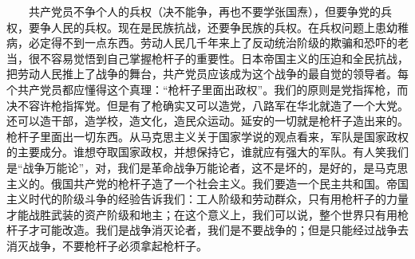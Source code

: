 \documentclass[cn,11pt,chinese]{elegantbook}
\begin{document}
　　共产党员不争个人的兵权（决不能争，再也不要学张国焘），但要争党的兵权，要争人民的兵权。现在是民族抗战，还要争民族的兵权。在兵权问题上患幼稚病，必定得不到一点东西。劳动人民几千年来上了反动统治阶级的欺骗和恐吓的老当，很不容易觉悟到自己掌握枪杆子的重要性。日本帝国主义的压迫和全民抗战，把劳动人民推上了战争的舞台，共产党员应该成为这个战争的最自觉的领导者。每个共产党员都应懂得这个真理：“枪杆子里面出政权”。我们的原则是党指挥枪，而决不容许枪指挥党。但是有了枪确实又可以造党，八路军在华北就造了一个大党。还可以造干部，造学校，造文化，造民众运动。延安的一切就是枪杆子造出来的。枪杆子里面出一切东西。从马克思主义关于国家学说的观点看来，军队是国家政权的主要成分。谁想夺取国家政权，并想保持它，谁就应有强大的军队。有人笑我们是“战争万能论”，对，我们是革命战争万能论者，这不是坏的，是好的，是马克思主义的。俄国共产党的枪杆子造了一个社会主义。我们要造一个民主共和国。帝国主义时代的阶级斗争的经验告诉我们：工人阶级和劳动群众，只有用枪杆子的力量才能战胜武装的资产阶级和地主；在这个意义上，我们可以说，整个世界只有用枪杆子才可能改造。我们是战争消灭论者，我们是不要战争的；但是只能经过战争去消灭战争，不要枪杆子必须拿起枪杆子。\\
\end{document}
